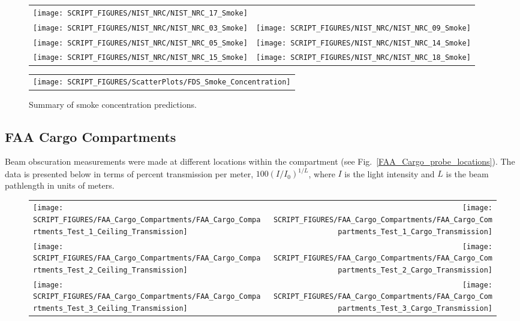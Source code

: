 \begin{figure}[p]
\begin{tabular*}{\textwidth}{l@{\extracolsep{\fill}}r}
\texttt{[image: SCRIPT\_FIGURES/NIST\_NRC/NIST\_NRC\_17\_Smoke]} &
 \\
\texttt{[image: SCRIPT\_FIGURES/NIST\_NRC/NIST\_NRC\_03\_Smoke]} &
\texttt{[image: SCRIPT\_FIGURES/NIST\_NRC/NIST\_NRC\_09\_Smoke]} \\
\texttt{[image: SCRIPT\_FIGURES/NIST\_NRC/NIST\_NRC\_05\_Smoke]} &
\texttt{[image: SCRIPT\_FIGURES/NIST\_NRC/NIST\_NRC\_14\_Smoke]} \\
\texttt{[image: SCRIPT\_FIGURES/NIST\_NRC/NIST\_NRC\_15\_Smoke]} &
\texttt{[image: SCRIPT\_FIGURES/NIST\_NRC/NIST\_NRC\_18\_Smoke]}
\end{tabular*}
\end{figure}


\begin{figure}[p]
\begin{center}
\begin{tabular}{c}
\texttt{[image: SCRIPT\_FIGURES/ScatterPlots/FDS\_Smoke\_Concentration]}
\end{tabular}
\end{center}
\caption[Summary of smoke concentration predictions]{Summary of smoke concentration predictions.}
\end{figure}

\clearpage

\subsection{FAA Cargo Compartments}
\label{Smoke Obscuration}

Beam obscuration measurements were made at different locations within the compartment (see Fig.~\ref{FAA_Cargo_probe_locations}). The data is presented below in terms of percent transmission per meter, $100(I/I_0)^{1/L}$, where $I$ is the light intensity and $L$ is the beam pathlength in units of meters.

\begin{figure}[h]
\begin{tabular*}{\textwidth}{l@{\extracolsep{\fill}}r}
\texttt{[image: SCRIPT\_FIGURES/FAA\_Cargo\_Compartments/FAA\_Cargo\_Compartments\_Test\_1\_Ceiling\_Transmission]} &
\texttt{[image: SCRIPT\_FIGURES/FAA\_Cargo\_Compartments/FAA\_Cargo\_Compartments\_Test\_1\_Cargo\_Transmission]} \\
\texttt{[image: SCRIPT\_FIGURES/FAA\_Cargo\_Compartments/FAA\_Cargo\_Compartments\_Test\_2\_Ceiling\_Transmission]} &
\texttt{[image: SCRIPT\_FIGURES/FAA\_Cargo\_Compartments/FAA\_Cargo\_Compartments\_Test\_2\_Cargo\_Transmission]} \\
\texttt{[image: SCRIPT\_FIGURES/FAA\_Cargo\_Compartments/FAA\_Cargo\_Compartments\_Test\_3\_Ceiling\_Transmission]} &
\texttt{[image: SCRIPT\_FIGURES/FAA\_Cargo\_Compartments/FAA\_Cargo\_Compartments\_Test\_3\_Cargo\_Transmission]}
\end{tabular*}
\end{figure}

